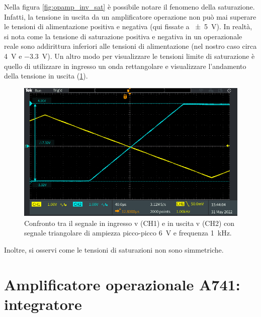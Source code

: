 Nella figura \ref{fig:opamp_inv_sat} è possibile notare il fenomeno della saturazione. Infatti, la tensione in uscita da un amplificatore operazione non può mai superare le tensioni di alimentazione positiva e negativa (qui fissate a \SI{+-5}{\volt}). In realtà, si nota come la tensione di saturazione positiva e negativa in un operazionale reale sono addirittura inferiori alle tensioni di alimentazione (nel nostro caso circa \SI{4}{\volt} e \SI{-3.3}{\volt}). Un altro modo per visualizzare le tensioni limite di saturazione è quello di utilizzare in ingresso un onda rettangolare e visualizzare l'andamento della tensione in uscita (\Fig\ref{fig:opamp_inv_sat_tri}).
\begin{figure}[h!]
	\centering
	\includegraphics[width=1\linewidth]{./ImageFiles/Laboratorio 4/TEK00015}
	\caption{Confronto tra il segnale in ingresso v (CH1)  e in uscita v (CH2) con segnale triangolare di ampiezza picco-picco \SI{6}{\volt} e frequenza \SI{1}{\kilo\hertz}.}
	\label{fig:opamp_inv_sat_tri}
\end{figure}

Inoltre, si osservi come le tensioni di saturazioni non sono simmetriche.

\clearpage

\section{Amplificatore operazionale \textmu A741: integratore}


